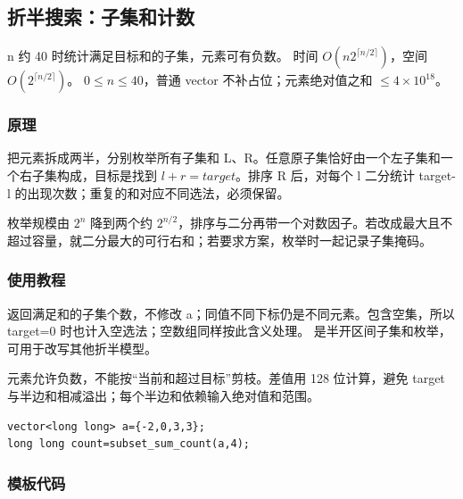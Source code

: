 \subsection{折半搜索：子集和计数}
\label{other:meet-middle}
\AlgorithmInfo
    {n 约 40 时统计满足目标和的子集，元素可有负数。}
    {时间 $O(n2^{\lceil n/2\rceil})$，空间 $O(2^{\lceil n/2\rceil})$。}
    {$0\le n\le40$，普通 vector 不补占位；元素绝对值之和 $\le4\times10^{18}$。}
\subsubsection*{原理}
把元素拆成两半，分别枚举所有子集和 L、R。任意原子集恰好由一个左子集和一个右子集构成，目标是找到 $l+r=target$。排序 R 后，对每个 l 二分统计 target-l 的出现次数；重复的和对应不同选法，必须保留。

枚举规模由 $2^n$ 降到两个约 $2^{n/2}$，排序与二分再带一个对数因子。若改成最大且不超过容量，就二分最大的可行右和；若要求方案，枚举时一起记录子集掩码。
\subsubsection*{使用教程}
 返回满足和的子集个数，不修改 a；同值不同下标仍是不同元素。包含空集，所以 target=0 时也计入空选法；空数组同样按此含义处理。 是半开区间子集和枚举，可用于改写其他折半模型。

元素允许负数，不能按“当前和超过目标”剪枝。差值用 128 位计算，避免 target 与半边和相减溢出；每个半边和依赖输入绝对值和范围。
\begin{lstlisting}[style=mtycpp,numbers=none]
vector<long long> a={-2,0,3,3};
long long count=subset_sum_count(a,4);
\end{lstlisting}
\subsubsection*{模板代码}
